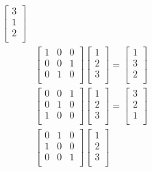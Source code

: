 \documentclass{article}
\begin{document}
\begin{equation*}
\begin{split}
\begin{bmatrix}
            3\\
            1\\
            2\\
        \end{bmatrix}\\
        &\begin{bmatrix}
            1&0&0\\
            0&0&1\\
            0&1&0\\
        \end{bmatrix}\begin{bmatrix}
            1\\
            2\\
            3\\
        \end{bmatrix}=\begin{bmatrix}
            1\\
            3\\
            2\\
        \end{bmatrix}\\
        &\begin{bmatrix}
            0&0&1\\
            0&1&0\\
            1&0&0\\
        \end{bmatrix}\begin{bmatrix}
            1\\
            2\\
            3\\
        \end{bmatrix}=\begin{bmatrix}
            3\\
            2\\
            1\\
        \end{bmatrix}\\
        &\begin{bmatrix}
            0&1&0\\
            1&0&0\\
            0&0&1\\
        \end{bmatrix}\begin{bmatrix}
            1\\
            2\\
            3\\

\end{bmatrix}
\end{split}
\end{equation*}
\end{document}
